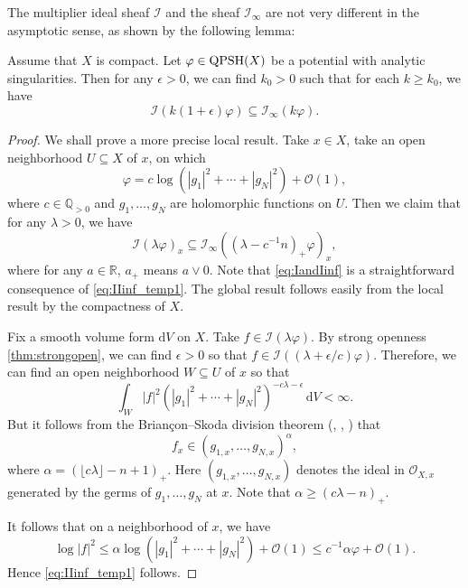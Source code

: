 The multiplier ideal sheaf $\mathcal{I}$ and the sheaf $\mathcal{I}_{\infty}$ are not very different in the asymptotic sense, as shown by the following lemma:
\begin{lemma}\label{lma:IandIinf}
    Assume that $X$ is compact. Let $\varphi\in \mathrm{QPSH}(X)$ be a potential with analytic singularities. Then for any $\epsilon>0$, we can find $k_0>0$ such that for each $k\geq k_0$, we have
    \begin{equation}\label{eq:IandIinf}
        \mathcal{I}\left(k(1+\epsilon)\varphi\right)\subseteq \mathcal{I}_{\infty}(k\varphi).
    \end{equation}
\end{lemma}
\begin{proof}
    We shall prove a more precise local result. Take $x\in X$, take an open neighborhood $U\subseteq X$ of $x$, on which
    \[
    \varphi=c\log \left( |g_1|^2 +\cdots+|g_N|^2\right)+\mathcal{O}(1),
    \]
    where $c\in \mathbb{Q}_{>0}$ and $g_1,\ldots,g_N$ are holomorphic functions on $U$. Then we claim that for any $\lambda>0$, we have
    \begin{equation}\label{eq:IIinf_temp1}
        \mathcal{I}(\lambda\varphi)_x\subseteq \mathcal{I}_{\infty}\left( \left( \lambda-c^{-1}n \right)_+\varphi \right)_x,
    \end{equation}
    where for any $a\in \mathbb{R}$, $a_+$ means $a\lor 0$. Note that \eqref{eq:IandIinf} is a straightforward consequence of \eqref{eq:IIinf_temp1}. The global result follows easily from the local result by the compactness of $X$.

    Fix a smooth volume form $\mathrm{d}V$ on $X$.
    Take $f\in \mathcal{I}(\lambda\varphi)$. By strong openness \cref{thm:strongopen}, we can find $\epsilon>0$ so that $f\in \mathcal{I}((\lambda+\epsilon/c)\varphi)$. Therefore, we can find an open neighborhood $W\subseteq U$ of $x$ so that
    \[
    \int_W |f|^2\left( |g_1|^2 +\cdots+|g_N|^2\right)^{-c\lambda-\epsilon}\,\mathrm{d}V<\infty.
    \]
    But it follows from the Briançon--Skoda division theorem (\cite{Sko72}, \cite{SB74}, \cite[Theorem~11.17]{Dem12}) that
    \[
    f_x\in \left(g_{1,x},\ldots,g_{N,x} \right)^\alpha,
    \]
    where $\alpha=\left(\lfloor c \lambda \rfloor-n+1\right)_+$. Here $\left(g_{1,x},\ldots,g_{N,x} \right)$ denotes the ideal in $\mathcal{O}_{X,x}$ generated by the germs of $g_1,\ldots,g_N$ at $x$. Note that $\alpha\geq (c\lambda-n)_+$.

    It follows that on a neighborhood of $x$, we have
    \[
    \log |f|^2\leq \alpha \log \left( |g_1|^2 +\cdots+|g_N|^2\right)+\mathcal{O}(1)\leq c^{-1}\alpha \varphi+\mathcal{O}(1).
    \]
    Hence \eqref{eq:IIinf_temp1} follows.
\end{proof}

